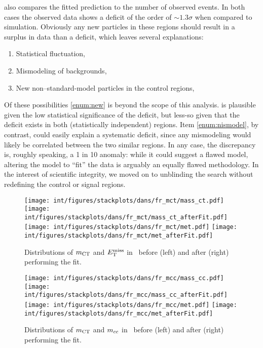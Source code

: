  also compares the fitted prediction to the number of observed events. In both cases the observed data shows a deficit of the order of $\sim 1.3 \sigma$ when compared to simulation. Obviously any new particles in these regions should result in a surplus in data than a deficit, which leaves several explanations:
\begin{enumerate}
\item Statistical fluctuation, \label{enum:statfluc}
\item Mismodeling of backgrounds, \label{enum:mismodel}
\item New non--standard-model particles in the control regions, \label{enum:new}
\end{enumerate}
Of these possibilities \cref{enum:new} is beyond the scope of this analysis.
 is plausible given the low statistical significance of
the deficit, but less-so given that the deficit exists in both (statistically independent) regions. Item \cref{enum:nismodel}, by contrast,
could easily explain a systematic deficit, since any mismodeling would likely be correlated between the two similar regions. In any case, the
discrepancy is, roughly speaking, a 1 in 10 anomaly: while it could suggest a flawed model, altering the model to ``fit'' the data is arguably an equally flawed methodology. In the interest of scientific integrity, we
moved on to unblinding the search without redefining the control or signal
regions.

\begin{figure}[!p]
\centering
\texttt{[image: int/figures/stackplots/dans/fr\_mct/mass\_ct.pdf]}
\texttt{[image: int/figures/stackplots/dans/fr\_mct/mass\_ct\_afterFit.pdf]}\\
\texttt{[image: int/figures/stackplots/dans/fr\_mct/met.pdf]}
\texttt{[image: int/figures/stackplots/dans/fr\_mct/met\_afterFit.pdf]}
\caption[Distributions of $\mct$ and $\met$ in \vrmct\ before and after the fit]{Distributions of $\mct$ and $\met$ in \vrmct\ before (left) and after (right) performing the fit.}
\label{fig:dist-vrmct}
\end{figure}

\begin{figure}[!p]
\centering
\texttt{[image: int/figures/stackplots/dans/fr\_mcc/mass\_cc.pdf]}
\texttt{[image: int/figures/stackplots/dans/fr\_mcc/mass\_cc\_afterFit.pdf]}\\
\texttt{[image: int/figures/stackplots/dans/fr\_mcc/met.pdf]}
\texttt{[image: int/figures/stackplots/dans/fr\_mcc/met\_afterFit.pdf]}
\caption[Distributions of $\mct$ and $\mcc$ in the \vrmcc\ region before and after the fit.]{Distributions of $\mct$ and $\mcc$ in \vrmcc\ before (left) and after (right) performing the fit.}
\label{fig:dist-vrmcc}
\end{figure}


